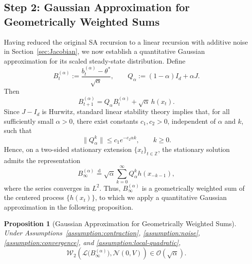 \documentclass[11pt,letterpaper]{article}
\theoremstyle{plain}
\newtheorem{proposition}{Proposition}
\theoremstyle{definition}
\theoremstyle{remark}
\newcommand{\W}{\mathcal{W}}
\newcommand{\law}{\mathcal{L}}
\begin{document}
\subsection{Step 2: Gaussian Approximation for Geometrically Weighted Sums}
\label{sec:geometric-weight}

Having reduced the original SA recursion to a linear recursion with additive
noise in Section~\ref{sec:Jacobian}, we now establish a quantitative Gaussian
approximation for its scaled steady-state distribution. Define
\[
    B_t^{(\alpha)}
    :=
    \frac{b_t^{(\alpha)}-\theta^*}{\sqrt{\alpha}},
    \qquad
    Q_\alpha
    :=
    (1-\alpha)I_d+\alpha J.
\]
Then
\begin{equation}
\label{eq:scaled-linearized-recursion}
    B_{t+1}^{(\alpha)}
    =
    Q_\alpha B_t^{(\alpha)}
    +
    \sqrt{\alpha}\,h(x_t).
\end{equation}
Since \(J-I_d\) is Hurwitz, standard linear stability theory implies that,
for all sufficiently small \(\alpha>0\), there exist constants
\(c_1,c_2>0\), independent of \(\alpha\) and $k$, such that
\begin{equation}\label{eq:Qalpha-geometric-decay}
 \|Q_\alpha^k\|
    \leq
    c_1 e^{-c_2\alpha k},
    \qquad k\geq0.
\end{equation}
Hence, on a two-sided stationary extension
\(\{x_t\}_{t\in\mathbb Z}\), the stationary solution admits the representation
\begin{equation}
\label{eq:geometric-sum-representation}
    B_\infty^{(\alpha)}
    \overset{\mathrm d}{=}
    \sqrt{\alpha}
    \sum_{k=0}^{\infty}
    Q_\alpha^k h(x_{-k-1}),
\end{equation}
where the series converges in \(L^2\). Thus,
\(B_\infty^{(\alpha)}\) is a geometrically weighted sum of the centered
process \(\{h(x_t)\}\), to which we apply a quantitative Gaussian
approximation in the following proposition.

\begin{proposition}[Gaussian Approximation for Geometrically Weighted Sums]
\label{prop:geometric-gaussian}
Under Assumptions~\ref{assumption:contraction},
\ref{assumption:noise}, \ref{assumption:convergence}, and
\ref{assumption:local-quadratic},
\[
\W_2\left(
    \law\bigl(B_\infty^{(\alpha)}\bigr),
    \mathcal{N}(0,V)
\right)
\in 
\mathcal{O}(\sqrt{\alpha}).
\]
\end{proposition}
\end{document}
